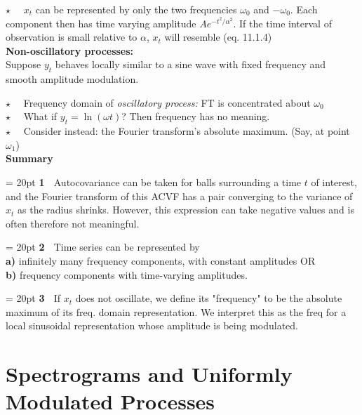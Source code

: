 \hangindent=20pt
$\star\quad$ $x_t$ can be represented by only the two frequencies $\omega_0$ and $-\omega_0$. Each component then has time varying amplitude $Ae^{-t^2/\alpha^2}$. If the time interval of observation is small relative to $\alpha$, $x_t$ will resemble (eq. 11.1.4) \\ 

\colorbox{briest}{\color{black}\textbf{Non-oscillatory processes: }} \\ 
\color{priest} Suppose $y_t$ behaves locally similar to a sine wave with fixed frequency and smooth amplitude modulation.

$\star\quad$ Frequency domain of \textit{oscillatory process:} FT is concentrated about $\omega_0$\\
$\star\quad$ What if $y_t = \ln(\omega t)$? Then frequency has no meaning.\\
$\star\quad$ Consider instead: the Fourier transform's absolute maximum. (Say, at point $\omega_1$)\\

\colorbox{briest}{\color{black}\textbf{Summary}}

\hangindent = 20pt
\textbf{1} $\;$ Autocovariance can be taken for balls surrounding a time $t$ of interest, and the Fourier transform of this ACVF has a pair converging to the variance of $x_t$ as the radius shrinks. However, this expression can take negative values and is often therefore not meaningful.

\hangindent = 20pt
\textbf{2} $\;$ Time series can be represented by\\
\textbf{a)} infinitely many frequency components, with constant amplitudes OR\\
\textbf{b)} frequency components with time-varying amplitudes.

\hangindent = 20pt
\textbf{3} $\;$ If $x_t$ does not oscillate, we define its "frequency" to be the absolute maximum of its freq. domain representation. We interpret this as the freq for a local sinusoidal representation whose amplitude is being modulated.

\color{azadeh}\section{\color{black} Spectrograms and Uniformly Modulated Processes}

